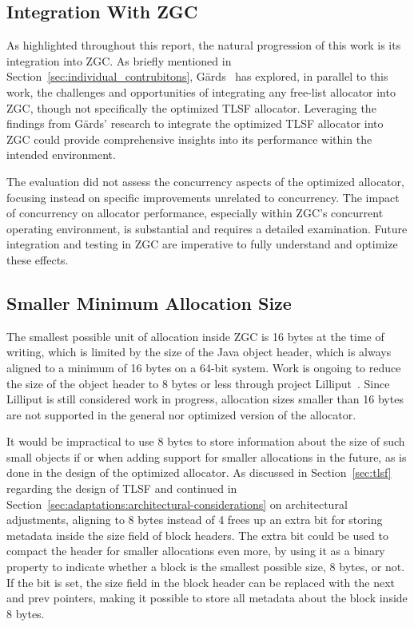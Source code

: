 
\subsection{Integration With ZGC}
\label{sec:future-work:integration}

As highlighted throughout this report, the natural progression of this work is its integration into ZGC. As briefly mentioned in Section~\ref{sec:individual_contrubitons}, Gärds~\cite{niclas} has explored, in parallel to this work, the challenges and opportunities of integrating any free-list allocator into ZGC, though not specifically the optimized TLSF allocator. Leveraging the findings from Gärds’ research to integrate the optimized TLSF allocator into ZGC could provide comprehensive insights into its performance within the intended environment.

The evaluation did not assess the concurrency aspects of the optimized allocator, focusing instead on specific improvements unrelated to concurrency. The impact of concurrency on allocator performance, especially within ZGC's concurrent operating environment, is substantial and requires a detailed examination. Future integration and testing in ZGC are imperative to fully understand and optimize these effects.

\subsection{Smaller Minimum Allocation Size}
\label{sec:future-work:lilliput}

The smallest possible unit of allocation inside ZGC is 16 bytes at the time of writing, which is limited by the size of the Java object header, which is always aligned to a minimum of 16 bytes on a 64-bit system. Work is ongoing to reduce the size of the object header to 8 bytes or less through project Lilliput~\cite{lilliput}. Since Lilliput is still considered work in progress, allocation sizes smaller than 16 bytes are not supported in the general nor optimized version of the allocator.

It would be impractical to use 8 bytes to store information about the size of such small objects if or when adding support for smaller allocations in the future, as is done in the design of the optimized allocator. As discussed in Section~\ref{sec:tlsf} regarding the design of TLSF and continued in Section~\ref{sec:adaptations:architectural-considerations} on architectural adjustments, aligning to 8 bytes instead of 4 frees up an extra bit for storing metadata inside the size field of block headers. The extra bit could be used to compact the header for smaller allocations even more, by using it as a binary property to indicate whether a block is the smallest possible size, 8 bytes, or not. If the bit is set, the size field in the block header can be replaced with the next and prev pointers, making it possible to store all metadata about the block inside 8 bytes.


